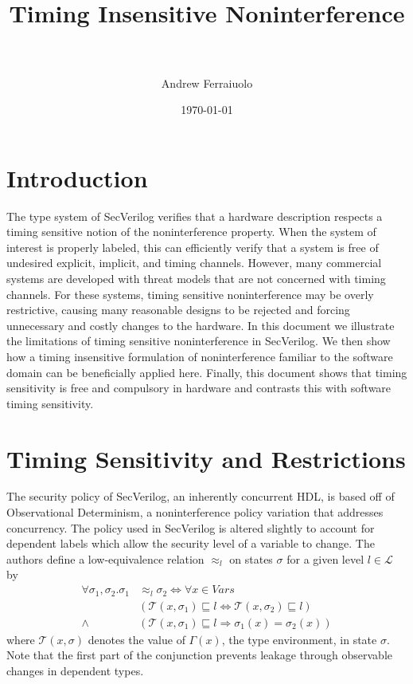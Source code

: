 \documentclass[paper=a4, fontsize=10pt]{scrartcl} %
\title{	\normalfont \normalsize 
\horrule{0.5pt} \\[0.4cm] %
\huge Timing Insensitive Noninterference\\ %
\horrule{2pt} \\[0.5cm] %
}
\author{Andrew Ferraiuolo} %
\date{\normalsize\today} %
\begin{document}
\maketitle %


\section{Introduction}

The type system of SecVerilog verifies that a hardware description respects a 
timing sensitive notion of the noninterference property. When the system of 
interest is properly labeled, this can efficiently verify that a system is free 
of undesired explicit, implicit, and timing channels. However, many commercial 
systems are developed with threat models that are not concerned with timing 
channels. For these systems, timing sensitive noninterference may be overly 
restrictive, causing many reasonable designs to be rejected and forcing 
unnecessary and costly changes to the hardware. In this document we illustrate 
the limitations of timing sensitive noninterference in SecVerilog. We then show 
how a timing insensitive formulation of noninterference familiar to the 
software domain can be beneficially applied here. Finally, this document shows 
that timing sensitivity is free and compulsory in hardware and contrasts this 
with software timing sensitivity.

\section{Timing Sensitivity and Restrictions}
The security policy of SecVerilog, an inherently concurrent HDL, is based off 
of Observational Determinism, a noninterference policy variation that addresses 
concurrency. The policy used in SecVerilog is altered slightly to account for 
dependent labels which allow the security level of a variable to change. The 
authors define a low-equivalence relation $\approx_l$ on states $\sigma$ for a 
given level $l\in \mathcal{L}$ by
\begin{align*}
    \forall \sigma_1, \sigma_2. \sigma_1 & \approx_l \sigma_2 
    \Longleftrightarrow \forall x \in Vars \\
        & (\mathcal{T}(x,\sigma_1) \sqsubseteq l
        \Leftrightarrow \mathcal{T}(x,\sigma_2) \sqsubseteq l) \\
        \wedge & ( \mathcal{T}(x,\sigma_1) \sqsubseteq l \Rightarrow
        \sigma_1(x) = \sigma_2(x) )
\end{align*}
where $\mathcal{T}(x, \sigma)$ denotes the value of $\Gamma(x)$, the type 
environment, in state $\sigma$. Note that the first part of the conjunction 
prevents leakage through observable changes in dependent types.
\end{document}
